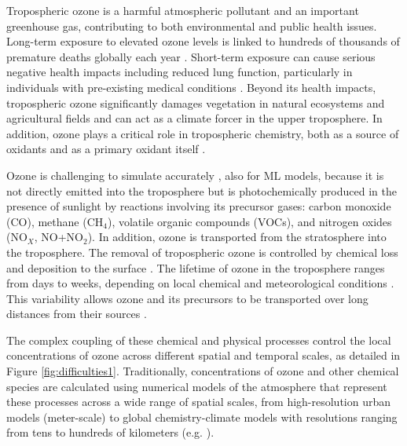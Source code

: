 \documentclass[gmd, manuscript]{copernicus}
\begin{document}
Tropospheric ozone is a harmful atmospheric pollutant and an important greenhouse gas, contributing to both environmental and public health issues. Long-term exposure to elevated ozone levels is linked to hundreds of thousands of premature deaths globally each year \citep{malashock_global_2022, malley_updated_2017, health_effects_institute_state_2024}. Short-term exposure can cause serious negative health impacts \citep{bell_who_2014} including reduced lung function, particularly in individuals with pre-existing medical conditions \citep{us2020integrated}. Beyond its health impacts, tropospheric ozone significantly damages vegetation in natural ecosystems and agricultural fields \citep{mills_ozone_2018} and can act as a climate forcer in the upper troposphere. In addition, ozone plays a critical role in tropospheric chemistry, both as a source of oxidants and as a primary oxidant itself \citep{monks_tropospheric_2015}.

Ozone is challenging to simulate accurately \citep{young_tropospheric_2018}, also for ML models, because it is not directly emitted into the troposphere but is photochemically produced in the presence of sunlight by reactions involving its precursor gases: carbon monoxide (CO), methane (CH$_4$), volatile organic compounds (VOCs), and nitrogen oxides (NO$_X$, NO+NO$_2$). In addition, ozone is transported from the stratosphere into the troposphere. The removal of tropospheric ozone is controlled by chemical loss and deposition to the surface \citep{archibald_tropospheric_2020}. The lifetime of ozone in the troposphere ranges from days to weeks, depending on local chemical and meteorological conditions \citep{lelieveld_what_2000, monks_tropospheric_2015}. This variability allows ozone and its precursors to be transported over long distances from their sources \citep{fiore_multimodel_2009}.

The complex coupling of these chemical and physical processes control the local concentrations of ozone across different spatial and temporal scales, as detailed in Figure \ref{fig:difficulties1}. Traditionally, concentrations of ozone and other chemical species are calculated using numerical models of the atmosphere that represent these processes across a wide range of spatial scales, from high-resolution urban models (meter-scale) to global chemistry-climate models with resolutions ranging from tens to hundreds of kilometers (e.g. \citet{Morgenstern2017}). 
\end{document}
